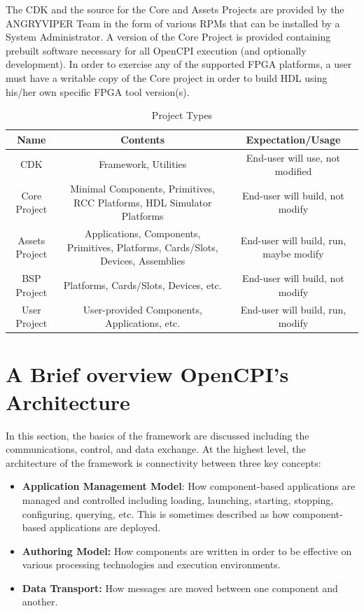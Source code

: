 The CDK and the source for the Core and Assets Projects are provided by the ANGRYVIPER Team in the form of various RPMs that can be installed by a System Administrator. A version of the Core Project is provided containing prebuilt software necessary for all OpenCPI execution (and optionally development).  In order to exercise any of the supported FPGA platforms, a user must have a writable copy of the Core project in order to build HDL using his/her own specific FPGA tool version(s).

\begin{center}
\begin{table}[h]
\caption{Project Types}
\begin{tabularx}{\textwidth}{|c|C|C|}
\hline
{}
Name & Contents & Expectation/Usage\\
\hline
CDK & Framework, Utilities & End-user will use, not modified
\\
\hline
Core Project & Minimal Components, Primitives, RCC Platforms, HDL Simulator Platforms & End-user will build, not modify
\\
\hline
Assets Project & Applications, Components, Primitives, Platforms, Cards/Slots, Devices, Assemblies  & End-user will build, run, maybe modify
\\
\hline
BSP Project & Platforms, Cards/Slots, Devices, etc.  & End-user will build, not modify
\\
\hline
User Project & User-provided Components, Applications, etc. & End-user will build, run, modify
\\
\hline
\end{tabularx}
\end{table}
\end{center}

\newpage
\section{A Brief overview OpenCPI's Architecture}
In this section, the basics of the framework are discussed including the communications, control, and data exchange.
\label{sec:brief_ow_arch}
At the highest level, the architecture of the framework is connectivity between three key concepts:
\begin{itemize}
\item \textbf{Application Management Model}: How component-based applications are managed and controlled including loading, launching, starting, stopping, configuring, querying, etc. This is sometimes described as how component-based applications are deployed.
\item \textbf{Authoring Model:} How components are written in order to be effective on various
processing technologies and execution environments.
\item \textbf{Data Transport:} How messages are moved between one component and another.
\end{itemize}

